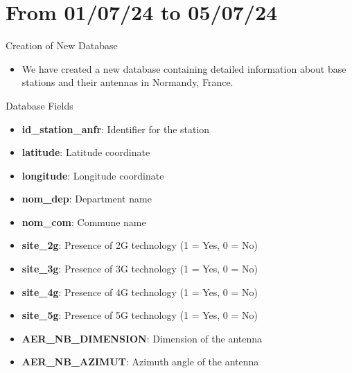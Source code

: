 \smallframetitle

\section{From 01/07/24 to 05/07/24}
\insertsectionframe


    
\begin{frame}{Creation of New Database}
    \begin{itemize}
        \item We have created a new database containing detailed information about base stations and their antennas in Normandy, France.
    \end{itemize}
    \begin{block}{Database Fields}
        \begin{itemize}
            \item \textbf{id\_station\_anfr}: Identifier for the station
            \item \textbf{latitude}: Latitude coordinate
            \item \textbf{longitude}: Longitude coordinate
            \item \textbf{nom\_dep}: Department name
            \item \textbf{nom\_com}: Commune name
            \item \textbf{site\_2g}: Presence of 2G technology (1 = Yes, 0 = No)
            \item \textbf{site\_3g}: Presence of 3G technology (1 = Yes, 0 = No)
            \item \textbf{site\_4g}: Presence of 4G technology (1 = Yes, 0 = No)
            \item \textbf{site\_5g}: Presence of 5G technology (1 = Yes, 0 = No)
            \item \textbf{AER\_NB\_DIMENSION}: Dimension of the antenna
            \item \textbf{AER\_NB\_AZIMUT}: Azimuth angle of the antenna
        \end{itemize}
    \end{block}
\end{frame}
    
